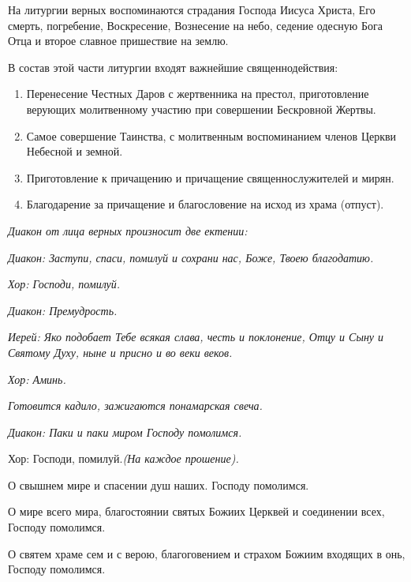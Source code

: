   На литургии верных воспоминаются страдания Господа Иисуса Христа, Его смерть, погребение, Воскресение, Вознесение на небо, седение одесную Бога Отца и второе славное пришествие на землю.


В состав этой части литургии входят важнейшие священнодействия:
\begin{enumerate}

\item Перенесение Честных Даров с жертвенника на престол, приготовление верующих молитвенному участию при совершении Бескровной Жертвы.


\item Самое совершение Таинства, с молитвенным воспоминанием членов Церкви Небесной и земной. 


\item Приготовление к причащению и причащение священнослужителей и мирян.


\item Благодарение за причащение и благословение на исход из храма (отпуст).

\end{enumerate}




\itshape Диакон от лица верных произносит две ектении:\normalfont{}


 \itshape  Диакон:\normalfont{} Заступи, спаси, помилуй и сохрани нас, Боже, Твоею благодатию.


\itshape Хор:\normalfont{} Господи, помилуй.


\itshape Диакон:\normalfont{} Премудрость.


\itshape  Иерей:\normalfont{} Яко подобает Тебе всякая слава, честь и поклонение, Отцу и Сыну и Святому Духу, ныне и присно и во веки веков.


\itshape  Хор:\normalfont{} Аминь.


\itshape  Готовится кадило, зажигаются понамарская свеча.\normalfont{}


 \itshape  Диакон:\normalfont{} Паки и паки миром Господу помолимся. \itshape  


  Хор:\normalfont{} Господи, помилуй.\itshape  (На каждое прошение)\normalfont{}. 


  О свышнем мире и спасении душ наших. Господу помолимся. 


  О мире всего мира, благостоянии святых Божиих Церквей и соединении всех, Господу помолимся. 


  О святем храме сем и с верою, благоговением и страхом Божиим входящих в онь, Господу помолимся. 


